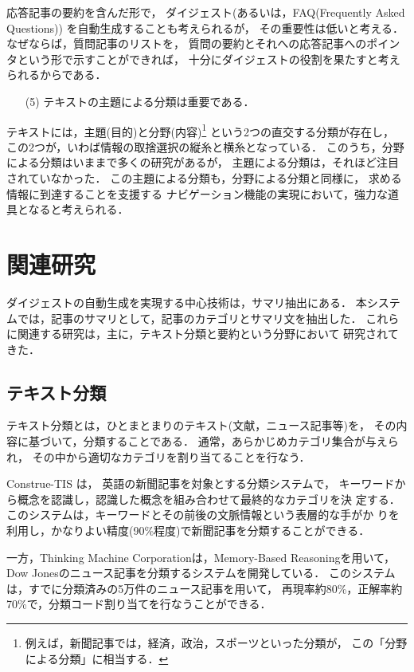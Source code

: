 応答記事の要約を含んだ形で，
ダイジェスト(あるいは，FAQ(Frequently Asked Questions))
を自動生成することも考えられるが，
その重要性は低いと考える．なぜならば，質問記事のリストを，
質問の要約とそれへの応答記事へのポインタという形で示すことができれば，
十分にダイジェストの役割を果たすと考えられるからである．

\begin{enumerate}
\item[(5)] テキストの主題による分類は重要である．
\end{enumerate}

テキストには，主題(目的)と分野(内容)\footnote{
例えば，新聞記事では，経済，政治，スポーツといった分類が，
この「分野による分類」に相当する．}
という2つの直交する分類が存在し，
この2つが，いわば情報の取捨選択の縦糸と横糸となっている．
このうち，分野による分類はいままで多くの研究があるが，
主題による分類は，それほど注目されていなかった．
この主題による分類も，分野による分類と同様に，
求める情報に到達することを支援する
ナビゲーション機能の実現において，強力な道具となると考えられる．

\section{関連研究}

ダイジェストの自動生成を実現する中心技術は，サマリ抽出にある．
本システムでは，記事のサマリとして，記事のカテゴリとサマリ文を抽出した．
これらに関連する研究は，主に，テキスト分類と要約という分野において
研究されてきた．

\subsection{テキスト分類}

テキスト分類とは，ひとまとまりのテキスト(文献，ニュース記事等)を，
その内容に基づいて，分類することである．
通常，あらかじめカテゴリ集合が与えられ，
その中から適切なカテゴリを割り当てることを行なう．

Construe-TIS \cite{Construe-TIS-91}は，
英語の新聞記事を対象とする分類システムで，
キーワードから概念を認識し，認識した概念を組み合わせて最終的なカテゴリを決
定する．このシステムは，キーワードとその前後の文脈情報という表層的な手がか
りを利用し，かなりよい精度(90\%程度)で新聞記事を分類することができる．

一方，Thinking Machine Corporationは，Memory-Based Reasoningを用いて，
Dow Jonesのニュース記事を分類するシステムを開発している\cite{Masand-92}．
このシステムは，すでに分類済みの5万件のニュース記事を用いて，
再現率約80\%，正解率約70\%で，分類コード割り当てを行なうことができる．

